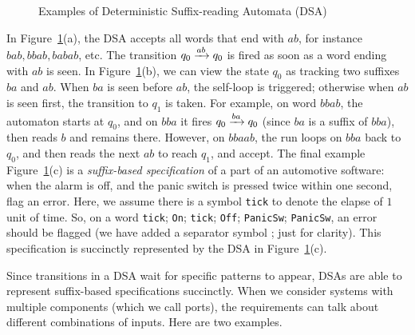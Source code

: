 \begin{figure}
  \caption{Examples of Deterministic Suffix-reading Automata (DSA)}
  \label{fig:dsa-examples}
  \end{figure}

  In Figure~\ref{fig:dsa-examples}(a), the DSA accepts all words that end with $ab$, for instance $bab, bbab, babab$, etc. The transition $q_0 \xrightarrow{ab} q_0$ is fired as soon as a word ending with $ab$ is seen. In Figure~\ref{fig:dsa-examples}(b), we can view the state $q_0$ as tracking two suffixes $ba$ and $ab$. When $ba$ is seen before $ab$, the self-loop is triggered; otherwise when $ab$ is seen first, the transition to $q_1$ is taken. For example, on word $bbab$, the automaton starts at $q_0$, and on $bba$ it fires $q_0 \xrightarrow{ba} q_0$ (since $ba$ is a suffix of $bba$), then reads $b$ and remains there. %
  However, on $bbaab$, the run loops on $bba$ back to $q_0$, and then reads the next $ab$ to reach $q_1$, and accept. The final example Figure~\ref{fig:dsa-examples}(c) is a \emph{suffix-based specification} of a part of an automotive software: when the alarm is off, and the panic switch is pressed twice within one second, flag an error. Here, we assume there is a symbol \texttt{tick} to denote the elapse of $1$ unit of time. So, on a word \texttt{tick}; \texttt{On}; \texttt{tick}; \texttt{Off}; \texttt{PanicSw}; \texttt{PanicSw}, an error should be flagged (we have added a separator symbol ; just for clarity). This specification is succinctly represented by the DSA in Figure~\ref{fig:dsa-examples}(c).

   Since transitions in a DSA wait for specific patterns to appear, DSAs are able to represent suffix-based specifications succinctly. When we consider systems with multiple components (which we call ports), the requirements can talk about different combinations of inputs. Here are two examples. 

